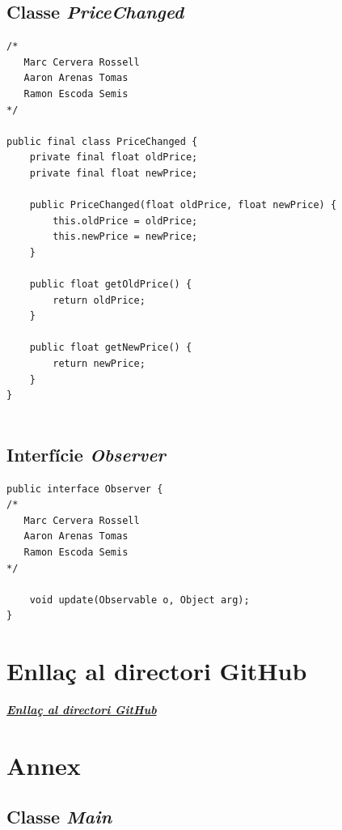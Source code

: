 \documentclass[a4paper,12pt]{article}
\begin{document}
\subsection{Classe \textit{PriceChanged}}
\begin{lstlisting}
/* 
   Marc Cervera Rossell
   Aaron Arenas Tomas
   Ramon Escoda Semis
*/

public final class PriceChanged {
    private final float oldPrice;
    private final float newPrice;

    public PriceChanged(float oldPrice, float newPrice) {
        this.oldPrice = oldPrice;
        this.newPrice = newPrice;
    }

    public float getOldPrice() {
        return oldPrice;
    }

    public float getNewPrice() {
        return newPrice;
    }
}


\end{lstlisting}

\subsection{Interfície \textit{Observer}}
\begin{lstlisting}
public interface Observer {
/* 
   Marc Cervera Rossell
   Aaron Arenas Tomas
   Ramon Escoda Semis
*/

    void update(Observable o, Object arg);
}
\end{lstlisting}

\section{Enllaç al directori GitHub}\label{sec:link}
\href{https://github.com/marc7666/3rd_practical_case_Software_engineering_II.git}{\textbf{\textit{Enllaç al directori GitHub}}}

\section{Annex}\label{sec:Annex}
\subsection{Classe \textit{Main}}
\end{document}
